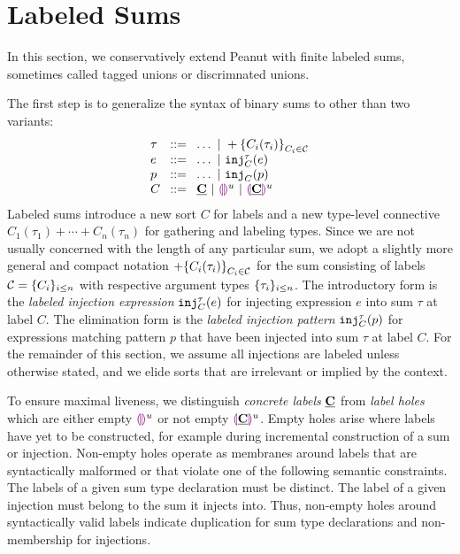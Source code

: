 \section{Labeled Sums}\label{sec:labeledsums}

In this section, we conservatively extend Peanut with finite labeled sums, sometimes called tagged unions or discrimnated unions.

The first step is to generalize the syntax of binary sums to other than two variants:
\[
  \arraycolsep=4pt\begin{array}{lll}
    \tau & ::= & \ldots ~\vert~ \tlabeledsum{C_i(\tau_i)}_{C_i \in \tagset} \\
    e    & ::= & \ldots ~\vert~ \hinj{C}{\tau}{e}                           \\
    p    & ::= & \ldots ~\vert~ \hinjp{C}{p}                                \\
    C    & ::= & \tagC ~\vert~ \tagehole{u} ~\vert~ \taghole{\tagC}{u}
  \end{array}
\]
Labeled sums introduce a new sort $C$ for labels and a new type-level connective $C_1(\tau_1) + \cdots + C_n(\tau_n)$ for gathering and labeling types.
Since we are not usually concerned with the length of any particular sum,
we adopt a slightly more general and compact notation $+\mathopen{}\left\{C_i(\tau_i)\right\}_{C_i \in \mathcal{C}}$
for the sum consisting of labels $\mathcal{C} = \{C_i\}_{i \leq n}$ with respective argument types $\{\tau_i\}_{i \leq n}$.
The introductory form is the \emph{labeled injection expression} $\mathtt{inj}_{C}^{\tau}({e})$ for injecting expression $e$ into sum $\tau$ at label $C$.
The elimination form is the \emph{labeled injection pattern} $\mathtt{inj}_{C}^{\tau}({p})$ 
for expressions matching pattern $p$ that have been injected into sum $\tau$ at label $C$.
For the remainder of this section, we assume all injections are labeled unless otherwise stated,
and we elide sorts that are irrelevant or implied by the context.

To ensure maximal liveness, we distinguish \emph{concrete labels} $\underline{\mathbf{C}}$
from \emph{label holes} which are either empty $\textcolor{violet}{\llparenthesis}\textcolor{violet}{\rrparenthesis}^{u}$ or not empty $\textcolor{violet}{\llparenthesis}\underline{\mathbf{C}}\textcolor{violet}{\rrparenthesis}^{u}$.
Empty holes arise where labels have yet to be constructed, for example during incremental construction of a sum or injection.
Non-empty holes operate as membranes around labels that are syntactically malformed or that violate one of the following semantic constraints.
The labels of a given sum type declaration must be distinct.
The label of a given injection must belong to the sum it injects into.
Thus, non-empty holes around syntactically valid labels indicate duplication for sum type declarations and non-membership for injections.

